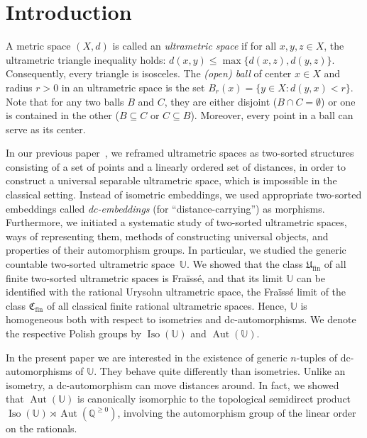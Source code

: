 \documentclass[oneside,notitlepage,12pt]{article}
\theoremstyle{definition}
\theoremstyle{remark}
\newcommand \Q {\mathbb{Q}}
\newcommand \Qpos {\Q^{\geq 0}}
\newcommand \U {\mathbb{U}}
\newcommand \fin {{\operatorname{fin}}}
\newcommand \Ult {\mathfrak{U}}
\newcommand \Aut {\operatorname{Aut}}
\newcommand \Iso {\operatorname{Iso}}
\begin{document}
\tableofcontents


\section{Introduction}

A metric space $(X,d)$ is called an {\em ultrametric space} if for all $x,y,z\in X$, the ultrametric triangle inequality holds: $d(x,y)\leq\max\{d(x,z), d(y,z)\}$. 
Consequently, every triangle is isosceles.
The {\em (open) ball} of center $x\in X$ and radius $r>0$ in an ultrametric space is the set $B_r(x)=\{y\in X\colon d(y,x)<r\}$.
Note that for any two balls $B$ and $C$, they are either disjoint ($B\cap C=\emptyset$) or one is contained in the other ($B\subseteq C$ or $C\subseteq B$). Moreover, every point in a ball can serve as its center.

In our previous paper~\cite{paper1}, we reframed ultrametric spaces as two-sorted structures consisting of a set of points and a linearly ordered set of distances, in order to construct a universal separable ultrametric space, which is impossible in the classical setting.
Instead of isometric embeddings, we used appropriate two-sorted embeddings called \emph{dc-embeddings} (for “distance-carrying”) as morphisms.
Furthermore, we initiated a systematic study of two-sorted ultrametric spaces, ways of representing them, methods of constructing universal objects, and properties of their automorphism groups.
In particular, we studied the generic countable two-sorted ultrametric space~$\U$.
We showed that the class $\Ult_\fin$ of all finite two-sorted ultrametric spaces is Fraïssé, and that its limit $\U$ can be identified with the rational Urysohn ultrametric space, the Fraïssé limit of the class $\mathfrak{C}_\fin$ of all classical finite rational ultrametric spaces.
Hence, $\U$ is homogeneous both with respect to isometries and dc-automorphisms.
We denote the respective Polish groups by $\Iso(\U)$ and $\Aut(\U)$.

In the present paper we are interested in the existence of generic $n$-tuples of dc-automorphisms of $\U$.
They behave quite differently than isometries.
Unlike an isometry, a dc-automorphism can move distances around.
In fact, we showed~\cite[Theorem~4.4]{paper1} that $\Aut(\U)$ is canonically isomorphic to the topological semidirect product $\Iso(\U) \rtimes \Aut(\Qpos)$, involving the automorphism group of the linear order on the rationals.
\end{document}
